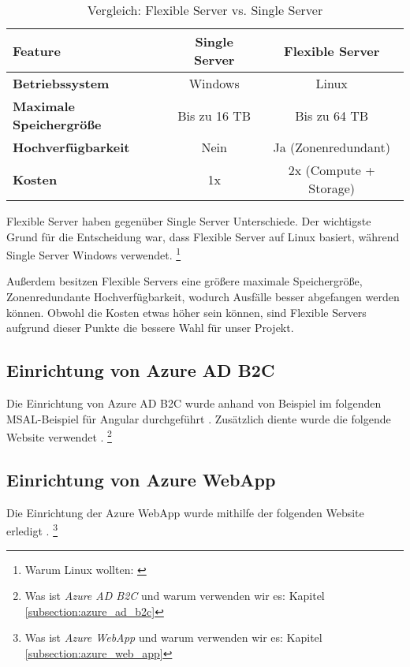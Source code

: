 \begin{table}[h t]
    \centering
    \caption{Vergleich: Flexible Server vs. Single Server}
    \label{tab:azure-postgresql}
    \begin{tabular}{lcc}
    \hline
    \textbf{Feature}                & \textbf{Single Server} & \textbf{Flexible Server} \\ \hline
    \textbf{Betriebssystem}         & Windows                & Linux                    \\
    \textbf{Maximale Speichergrö\ss{}e} & Bis zu 16 TB           & Bis zu 64 TB             \\
    \textbf{Hochverfügbarkeit}      & Nein                   & Ja (Zonenredundant)      \\
    \textbf{Kosten}                 & 1x                     & 2x (Compute + Storage)   \\ \hline
    \end{tabular}
\end{table}

Flexible Server haben gegenüber Single Server Unterschiede. 
Der wichtigste Grund für die Entscheidung war, dass Flexible Server auf Linux basiert, 
während Single Server Windows verwendet. \footnote{Warum Linux wollten: \cite{hussain2015survey}}

Au\ss{}erdem besitzen Flexible Servers eine grö\ss{}ere maximale Speichergrö\ss{}e, Zonenredundante Hochverfügbarkeit, 
wodurch Ausfälle besser abgefangen werden können. Obwohl die Kosten etwas höher sein können, 
sind Flexible Servers aufgrund dieser Punkte die bessere Wahl für unser Projekt.

\subsection{Einrichtung von Azure AD B2C}

Die Einrichtung von Azure AD B2C wurde anhand von Beispiel im folgenden MSAL-Beispiel
für Angular durchgeführt \cite{MicrosoftCorporationh}. Zusätzlich diente wurde die folgende
Website verwendet \cite{MicrosoftCorporationg}.
\footnote{Was ist \emph{Azure AD B2C} und warum verwenden wir es: Kapitel \ref{subsection:azure_ad_b2c}}

\subsection{Einrichtung von Azure WebApp}

Die Einrichtung der Azure WebApp wurde mithilfe der folgenden Website erledigt 
\cite{MicrosoftCorporationi}.
\footnote{Was ist \emph{Azure WebApp} und warum verwenden wir es: Kapitel \ref{subsection:azure_web_app}}


